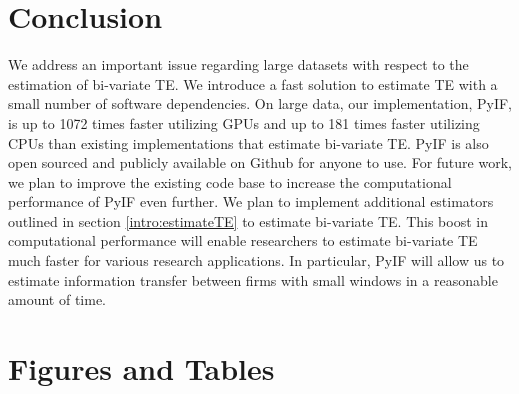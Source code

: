 \section{Conclusion}

We address an important issue regarding large datasets with respect to the estimation of bi-variate TE. We introduce a fast solution to estimate TE with a small number of software dependencies. On large data, our implementation, PyIF, is up to 1072 times faster utilizing GPUs and up to 181 times faster utilizing CPUs than existing implementations that estimate bi-variate TE.  PyIF is also open sourced and publicly available on Github for anyone to use.  For future work, we plan to improve the existing code base to increase the computational performance of PyIF even further. We plan to implement additional estimators outlined in section  \ref{intro:estimateTE} to estimate bi-variate TE. This boost in computational performance will enable researchers to estimate bi-variate TE much faster for various research applications. In particular, PyIF will allow us to estimate information transfer between firms with small windows in a reasonable amount of time.

\clearpage
\section{Figures and Tables}




